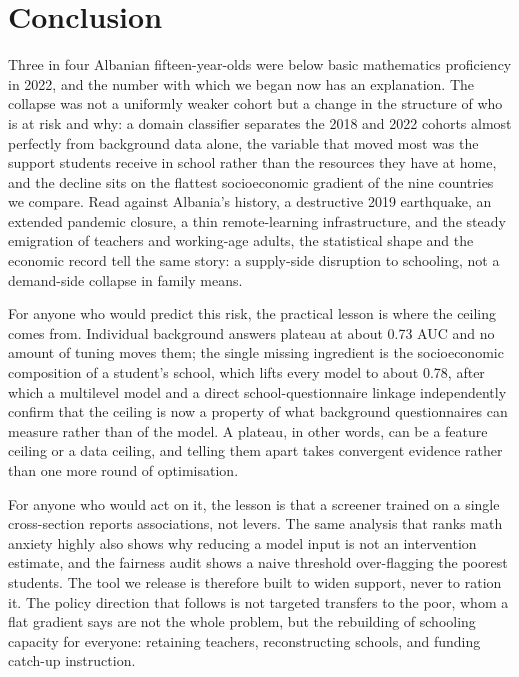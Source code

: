 \section{Conclusion}
\label{sec:conclusion}

Three in four Albanian fifteen-year-olds were below basic mathematics proficiency in
2022, and the number with which we began now has an explanation. The collapse was not a
uniformly weaker cohort but a change in the structure of who is at risk and why: a
domain classifier separates the 2018 and 2022 cohorts almost perfectly from background
data alone, the variable that moved most was the support students receive in school
rather than the resources they have at home, and the decline sits on the flattest
socioeconomic gradient of the nine countries we compare. Read against Albania's
history, a destructive 2019 earthquake, an extended pandemic closure, a thin
remote-learning infrastructure, and the steady emigration of teachers and working-age
adults, the statistical shape and the economic record tell the same story: a
supply-side disruption to schooling, not a demand-side collapse in family means.

For anyone who would predict this risk, the practical lesson is where the ceiling comes
from. Individual background answers plateau at about 0.73 AUC and no amount of tuning
moves them; the single missing ingredient is the socioeconomic composition of a
student's school, which lifts every model to about 0.78, after which a multilevel model
and a direct school-questionnaire linkage independently confirm that the ceiling is now
a property of what background questionnaires can measure rather than of the model. A
plateau, in other words, can be a feature ceiling or a data ceiling, and telling them
apart takes convergent evidence rather than one more round of optimisation.

For anyone who would act on it, the lesson is that a screener trained on a single
cross-section reports associations, not levers. The same analysis that ranks math
anxiety highly also shows why reducing a model input is not an intervention estimate,
and the fairness audit shows a naive threshold over-flagging the poorest students. The
tool we release is therefore built to widen support, never to ration it. The policy
direction that follows is not targeted transfers to the poor, whom a flat gradient says
are not the whole problem, but the rebuilding of schooling capacity for everyone:
retaining teachers, reconstructing schools, and funding catch-up instruction.

